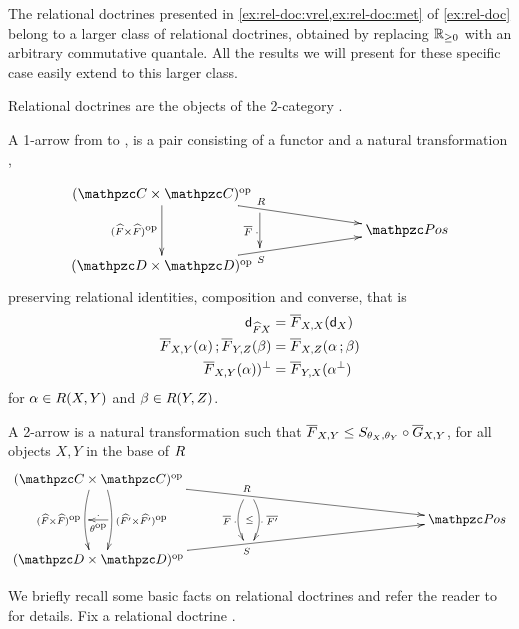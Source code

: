 \begin{remark} 
The relational doctrines presented in \cref{ex:rel-doc:vrel,ex:rel-doc:met} of \cref{ex:rel-doc} belong to a larger class of relational doctrines, 
obtained by replacing $\mathbb{R}_{\ge 0}$ with an arbitrary commutative quantale. 
All the results we will present for these specific case easily extend to this larger class. 
\end{remark}

Relational doctrines are the objects of the 2-category \RDtn. 

A 1-arrow  from \fun{\RDoc}{\bop\CC}{\Pos} to \fun{\SDoc}{\bop\D}{\Pos}, 
is a pair  consisting of 
a functor  and a natural transformation 
,

\[
\xymatrix@C=7.5em@R=1em{
{\bop\CC}\ar[rd]^(.4){\RDoc}_(.4){}="P"
\ar[dd]_{\bop{\fn{F}}}^{}="F"
&\\
 & {\ct{Pos}}\\
{\bop\D}\ar[ru]_(.4){\SDoc}^(.4){}="R"&
\ar"P";"R"_{\lift{F}\kern.5ex\cdot\kern-.5ex}="b"
}
\]
preserving relational identities, composition and converse, that is 
\begin{align*}
\mathsf{d}_{\widehat{F}X} &= \overline{F}_{X,X}(\mathsf{d}_X)\\ 
\overline{F}_{X,Y}(\alpha)\mathop{\mathbf{;}} \overline{F}_{Y,Z}(\beta) &= \overline{F}_{X,Z}(\alpha\mathop{\mathbf{;}}\beta)\\ 
\overline{F}_{X,Y}(\alpha))^{\bot} &= \overline{F}_{Y,X}(\alpha^{\bot})
\end{align*}
%
for $\alpha\in R(X,Y)$ and $\beta\in R(Y,Z)$. 

A 2-arrow  is a natural transformation  such that 
$\overline{F}_{X,Y} \leq S_{\theta_X,\theta_Y}\circ \overline{G}_{X,Y}$, for all objects $X,Y$ in the base of $R$
\[
\xymatrix@C=18em@R=1.5em{
{\bop\CC}\ar[rd]^(.4){\RDoc}_(.4){}="P"
\ar@<-1ex>@/_/[dd]_{\bop{\fn{F}}}^{}="F"\ar@<1ex>@/^/[dd]^{\bop{\fn{F'}}}_{}="G"&\\
 & {\ct{Pos}}\\
{\bop\D}\ar[ru]_(.4){\SDoc}^(.4){}="R"&
\ar@/_/"P";"R"_{\lift{F}\kern.5ex\cdot\kern-.5ex}="b"
\ar@<1ex>@/^/"P";"R"^{\kern-.5ex\cdot\kern.5ex \lift{F'}}="c"
\ar"G";"F"_{.}^{\theta\op}\ar@{}"b";"c"|{\le}}
\]

We briefly recall some basic facts on relational doctrines and refer the reader to  \cite{DagninoP23,DagninoP25apal} for details. 
Fix a relational doctrine \fun{\RDoc}{\bop{\CC}}{\Pos}. 

